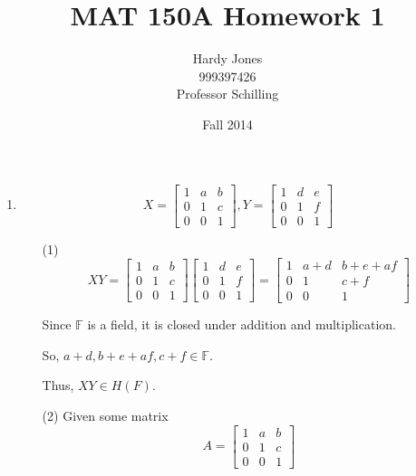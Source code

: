 \documentclass[12pt,letterpaper]{article}
\title{MAT 150A Homework 1\vspace{-2ex}}
\author{Hardy Jones\\
        999397426\\
        Professor Schilling\vspace{-2ex}}
\date{Fall 2014}
\begin{document}
  \maketitle

  \begin{enumerate}
    \item
      \[X =
        \begin{bmatrix}
          1 & a & b \\
          0 & 1 & c \\
          0 & 0 & 1
        \end{bmatrix}
        ,
        Y =
        \begin{bmatrix}
          1 & d & e \\
          0 & 1 & f \\
          0 & 0 & 1
        \end{bmatrix}
      \]
      \begin{enumerate}
        \item[(1)]
          \[XY =
            \begin{bmatrix}
              1 & a & b \\
              0 & 1 & c \\
              0 & 0 & 1
            \end{bmatrix}
            \begin{bmatrix}
              1 & d & e \\
              0 & 1 & f \\
              0 & 0 & 1
            \end{bmatrix}
            =
            \begin{bmatrix}
              1 & a + d & b + e + af \\
              0 & 1     & c + f \\
              0 & 0     & 1
            \end{bmatrix}
          \]

          Since $\mathbb{F}$ is a field, it is closed under addition and multiplication.

          So, $a+d, b+e+af, c+f \in \mathbb{F}$.

          Thus, $XY \in H(F)$.

        \item[(2)]
          Given some matrix
          \[A =
            \begin{bmatrix}
              1 & a & b \\
              0 & 1 & c \\
              0 & 0 & 1
            \end{bmatrix}
          \]


\end{enumerate}
\end{enumerate}
\end{document}

